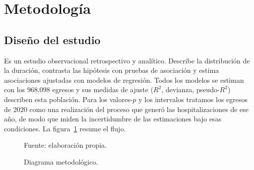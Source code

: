 \documentclass[10.5pt,a4paper,headings=small,abstract=false,bibliography=totoc,listof=totoc]{scrartcl}
\begin{document}
\section{Metodología}

\subsection{Diseño del estudio}

Es un estudio observacional retrospectivo y analítico. Describe la distribución de la duración, contrasta las hipótesis con pruebas de asociación y estima asociaciones ajustadas con modelos de regresión. Todos los modelos se estiman con los 968.098 egresos y sus medidas de ajuste ($R^2$, devianza, pseudo-$R^2$) describen esta población. Para los valores-$p$ y los intervalos tratamos los egresos de 2020 como una realización del proceso que generó las hospitalizaciones de ese año, de modo que miden la incertidumbre de las estimaciones bajo esas condiciones. La figura~\ref{fig:diagrama} resume el flujo.

\begin{figure}[!htb]
\centering
\caption{Diagrama metodológico.}
\label{fig:diagrama}
{\footnotesize\color{gris}Fuente: elaboración propia.\par}
\end{figure}
\end{document}
